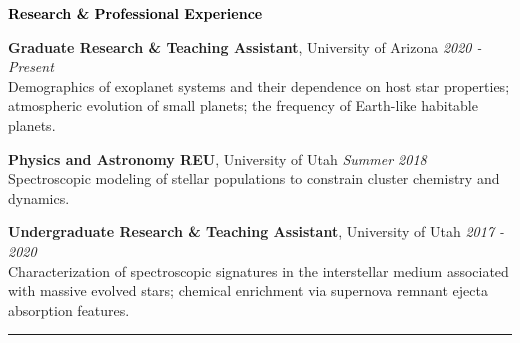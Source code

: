 \documentclass{resume} %
\newcommand{\mystrut}{\rule[-.3\baselineskip]{0pt}{\baselineskip}}
\newcommand{\cvline}[1]{\vspace*{\dimexpr-\parskip-0.3\baselineskip}\noindent\rule{\textwidth}{0.4pt}\vspace*{\dimexpr-0.3\parskip-0\baselineskip}}
\renewenvironment{rSection}[1]{\mystrut{\textcolor{black}{{\large{\textbf{#1}}}}}
\vspace{-5pt} %
\begin{list}{}{
\setlength{\leftmargin}{0em}
}
\item[]
}{
\end{list}
}
\begin{document}


\begin{rSection}{Research \& Professional Experience} 


{\bf Graduate Research \& Teaching Assistant}, University of Arizona \hfill {\em 2020 - Present} \\
{Demographics of exoplanet systems and their dependence on host star properties; atmospheric evolution of small planets; the frequency of Earth-like habitable planets.}\vspace{-5pt}

{\bf Physics and Astronomy REU}, University of Utah \hfill {\em Summer 2018} \\
{Spectroscopic modeling of stellar populations to constrain cluster chemistry and dynamics.}\vspace{-5pt}

{\bf Undergraduate Research \& Teaching Assistant}, University of Utah \hfill {\em 2017 - 2020} \\
{Characterization of spectroscopic signatures in the interstellar medium associated with massive evolved stars; chemical enrichment via supernova remnant ejecta absorption features.}
\end{rSection}
\cvline{}
\end{document}
